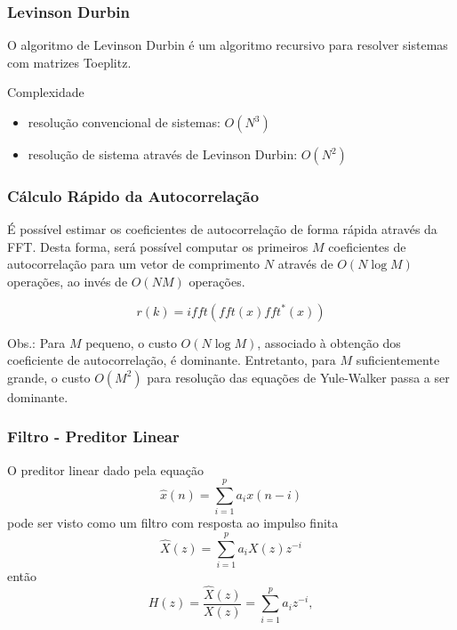 \begin{frame}
  \frametitle{Levinson Durbin}
  O algoritmo de Levinson Durbin é um algoritmo recursivo para resolver sistemas com matrizes Toeplitz.

  \vspace{1cm}
  Complexidade
  \begin{itemize}
  \item resolução convencional de sistemas: $O(N^3)$
  \item resolução de sistema através de Levinson Durbin: $O(N^2)$
  \end{itemize}
\end{frame}

\begin{frame}
  \frametitle{Cálculo Rápido da Autocorrelação}
  É possível estimar os coeficientes de autocorrelação de forma rápida através da FFT.
  Desta forma, será possível computar os primeiros $M$ coeficientes de autocorrelação
  para um vetor de comprimento $N$ através de $O(N\log M)$ operações, ao invés de $O(NM)$ operações.

  \begin{equation}
  r(k) = ifft(fft(x) fft^\ast(x))
  \end{equation}

  Obs.: Para $M$ pequeno, o custo $O(N\log M)$, associado à obtenção dos coeficiente de autocorrelação, é dominante.
  Entretanto, para $M$ suficientemente grande, o custo $O(M^2)$ para resolução das equações de Yule-Walker passa
  a ser dominante.
\end{frame}

\begin{frame}
  \frametitle{Filtro - Preditor Linear}

  O preditor linear dado pela equação
  \begin{equation}
  \hat{x}(n) = \sum_{i=1}^{p} a_i x(n-i)
  \end{equation}
  pode ser visto como um filtro com resposta ao impulso finita
  \begin{equation}
  \hat{X}(z) = \sum_{i=1}^{p} a_i X(z) z^{-i}
  \end{equation}
  então
  \begin{equation}
  H(z) = \frac{\hat{X}(z)}{X(z)} = \sum_{i=1}^{p} a_i z^{-i} ,
  \end{equation}
\end{frame}

